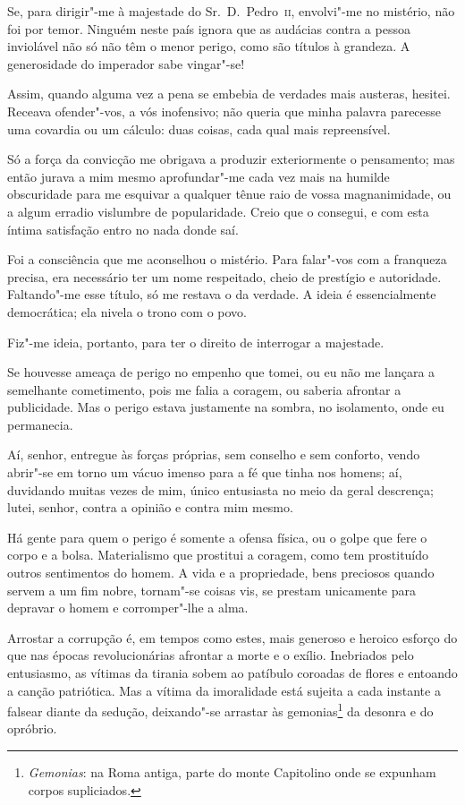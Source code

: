  Se, para dirigir"-me à majestade do Sr.~D.~Pedro~\textsc{ii}, envolvi"-me no
mistério, não foi por temor. Ninguém neste país ignora que as audácias
contra a pessoa inviolável não só não têm o menor perigo, como são
títulos à grandeza. A generosidade do imperador sabe vingar"-se!

 Assim, quando alguma vez a pena se embebia de verdades mais austeras,
hesitei. Receava ofender"-vos, a vós inofensivo; não queria que minha
palavra parecesse uma covardia ou um cálculo: duas coisas, cada qual
mais repreensível. 

 Só a força da convicção me obrigava a produzir exteriormente o
pensamento; mas então jurava a mim mesmo aprofundar"-me cada vez mais
na humilde obscuridade para me esquivar a qualquer tênue raio de vossa
magnanimidade, ou a algum erradio vislumbre de popularidade. Creio que
o consegui, e com esta íntima satisfação entro no nada donde saí. 

 Foi a consciência que me aconselhou o mistério. Para falar"-vos com a
franqueza precisa, era necessário ter um nome respeitado, cheio de
prestígio e autoridade. Faltando"-me esse título, só me restava o da
verdade. A ideia é essencialmente democrática; ela nivela o trono com o
povo. 

 Fiz"-me ideia, portanto, para ter o direito de interrogar a majestade.

 Se houvesse ameaça de perigo no empenho que tomei, ou eu não me lançara
a semelhante cometimento, pois me falia a coragem, ou saberia afrontar
a publicidade. Mas o perigo estava justamente na sombra, no isolamento,
onde eu permanecia. 

 Aí, senhor, entregue às forças próprias, sem conselho e sem conforto,
vendo abrir"-se em torno um vácuo imenso para a fé que tinha nos
homens; aí, duvidando muitas vezes de mim, único entusiasta no meio da
geral descrença; lutei, senhor, contra a opinião e contra mim mesmo. 

 Há gente para quem o perigo é somente a ofensa física, ou o golpe que
fere o corpo e a bolsa. Materialismo que prostitui a coragem, como tem
prostituído outros sentimentos do homem. A vida e a propriedade, bens
preciosos quando servem a um fim nobre, tornam"-se coisas vis, se
prestam unicamente para depravar o homem e corromper"-lhe a alma. 

 Arrostar a corrupção é, em tempos como estes, mais generoso e heroico
esforço do que nas épocas revolucionárias afrontar a morte e o exílio.
Inebriados pelo entusiasmo, as vítimas da tirania sobem ao patíbulo
coroadas de flores e entoando a canção patriótica. Mas a vítima da
imoralidade está sujeita a cada instante a falsear diante da sedução,
deixando"-se arrastar às
gemonias\footnote{ \textit{Gemonias}: na Roma antiga, parte do monte Capitolino onde se expunham
corpos supliciados.}  da desonra e do opróbrio. 

